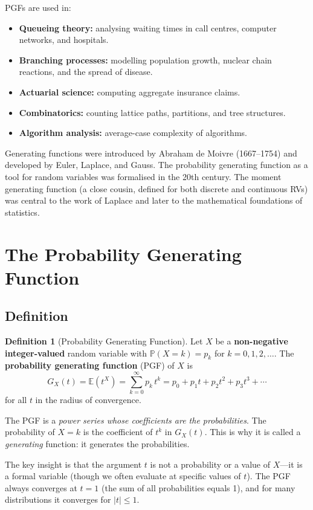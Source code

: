 \documentclass[12pt, a4paper, oneside]{book}
\theoremstyle{definition}
\newtheorem{definition}{Definition}[section]
\theoremstyle{plain}
\theoremstyle{remark}
\newcommand{\E}{\mathbb{E}}
\newcommand{\Prob}{\mathbb{P}}
\begin{document}
PGFs are used in:
\begin{itemize}
  \item \textbf{Queueing theory:} analysing waiting times in call centres,
        computer networks, and hospitals.
  \item \textbf{Branching processes:} modelling population growth,
        nuclear chain reactions, and the spread of disease.
  \item \textbf{Actuarial science:} computing aggregate insurance claims.
  \item \textbf{Combinatorics:} counting lattice paths, partitions, and
        tree structures.
  \item \textbf{Algorithm analysis:} average-case complexity of algorithms.
\end{itemize}

\begin{historicalbox}
Generating functions were introduced by Abraham de Moivre (1667--1754) and
developed by Euler, Laplace, and Gauss.  The probability generating function
as a tool for random variables was formalised in the 20th century.  The
moment generating function (a close cousin, defined for both discrete and
continuous RVs) was central to the work of Laplace and later to the
mathematical foundations of statistics.
\end{historicalbox}

\section{The Probability Generating Function}
\label{sec:pgf-def}

\subsection{Definition}

\begin{definition}[Probability Generating Function]
Let $X$ be a \textbf{non-negative integer-valued} random variable with
$\Prob(X=k) = p_k$ for $k=0,1,2,\ldots$.  The \textbf{probability generating
function} (PGF) of $X$ is
\[
  G_X(t) = \E(t^X) = \sum_{k=0}^{\infty} p_k\, t^k
  = p_0 + p_1 t + p_2 t^2 + p_3 t^3 + \cdots
\]
for all $t$ in the radius of convergence.
\end{definition}

\begin{intuition}
The PGF is a \emph{power series whose coefficients are the probabilities}.
The probability of $X=k$ is the coefficient of $t^k$ in $G_X(t)$.  This is
why it is called a \emph{generating} function: it generates the probabilities.

The key insight is that the argument $t$ is not a probability or a
value of $X$---it is a formal variable (though we often evaluate at specific
values of $t$).  The PGF always converges at $t=1$ (the sum of all
probabilities equals 1), and for many distributions it converges for $|t|\le1$.
\end{intuition}
\end{document}
